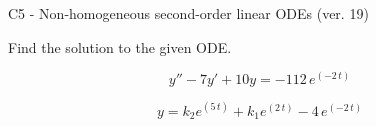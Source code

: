 \begin{exercise}
  \begin{exerciseTitle}C5 - Non-homogeneous second-order linear ODEs (ver. 19)\end{exerciseTitle}
  \begin{exerciseStatement}
    
Find the solution to the given ODE.

    
\[y''-7y'+10y = -112 \, e^{\left(-2 \, t\right)}\]

  \end{exerciseStatement}
  \begin{exerciseAnswer}
    
\[y= k_{2} e^{\left(5 \, t\right)} + k_{1} e^{\left(2 \, t\right)} - 4 \, e^{\left(-2 \, t\right)}\]

  \end{exerciseAnswer}
\end{exercise}